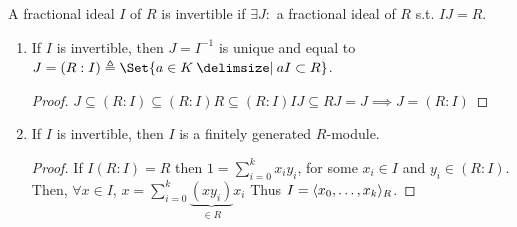 \begin{definition}
  A fractional ideal $I$ of $R$ is invertible if $\exists J:$ a fractional ideal
  of $R$ s.t. $IJ = R$.
\end{definition}

\begin{prop}\mbox{} \label{prop:property-of-fractional-ideal}
  \begin{enumerate}
    \item If $I$ is invertible, then $J = I^{-1}$ is unique and equal to
      $J = (R:I) \triangleq \Set{a \in K \given aI \subset R}$.
      \begin{proof}
        $ J \subseteq (R:I) \subseteq (R:I)R \subseteq (R:I)IJ \subseteq RJ = J
        \implies J = (R:I) $
      \end{proof}
    \item If $I$ is invertible, then $I$ is a finitely generated $R$-module.
      \begin{proof}
        If $I(R:I) = R$ then $1 = \sum\limits_{i = 0}^{k} x_iy_i$, for some $x_i \in I$ and
        $y_i \in (R:I)$. Then, $\forall x \in I$, $x = \sum\limits_{i = 0}^{k} 
        \underbrace{(xy_i)}_{\in R}x_i$ Thus $I = \langle x_0, \dots, x_k\rangle_R$.
      \end{proof}
  \end{enumerate}
\end{prop}

